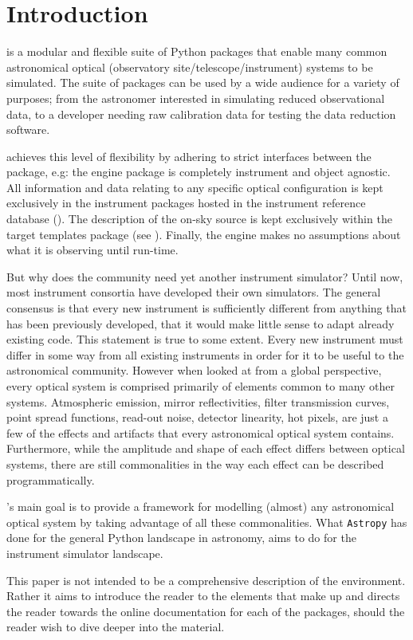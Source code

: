 

\section{Introduction}
\label{introduction}

\ScopeSim{} is a modular and flexible suite of Python packages that enable many common astronomical optical (observatory site/telescope/instrument) systems to be simulated.
The suite of packages can be used by a wide audience for a variety of purposes; from the astronomer interested in simulating reduced observational data, to a developer needing raw calibration data for testing the data reduction software.

\ScopeSim{} achieves this level of flexibility by adhering to strict interfaces between the package, e.g: the \ScopeSim{} engine package is completely instrument and object agnostic.
All information and data relating to any specific optical configuration is kept exclusively in the instrument packages hosted in the instrument reference database (\IRDB{}).
The description of the on-sky source is kept exclusively within the target templates package (see \ScopeSimtemplates{}).
Finally, the engine makes no assumptions about what it is observing until run-time.

But why does the community need yet another instrument simulator?
Until now, most instrument consortia have developed their own simulators.
The general consensus is that every new instrument is sufficiently different from anything that has been previously developed, that it would make little sense to adapt already existing code.
This statement is true to some extent.
Every new instrument must differ in some way from all existing instruments in order for it to be useful to the astronomical community.
However when looked at from a global perspective, every optical system is comprised primarily of elements common to many other systems.
Atmospheric emission, mirror reflectivities, filter transmission curves, point spread functions, read-out noise, detector linearity, hot pixels, are just a few of the effects and artifacts that every astronomical optical system contains.
Furthermore, while the amplitude and shape of each effect differs between optical systems, there are still commonalities in the way each effect can be described programmatically.

\ScopeSim{}'s main goal is to provide a framework for modelling (almost) any astronomical optical system by taking advantage of all these commonalities.
What \lstinline{Astropy} has done for the general Python landscape in astronomy, \ScopeSim{} aims to do for the instrument simulator landscape.

This paper is not intended to be a comprehensive description of the \ScopeSim{} environment. Rather it aims to introduce the reader to the elements that make up \ScopeSim{} and directs the reader towards the online documentation for each of the packages, should the reader wish to dive deeper into the material.
